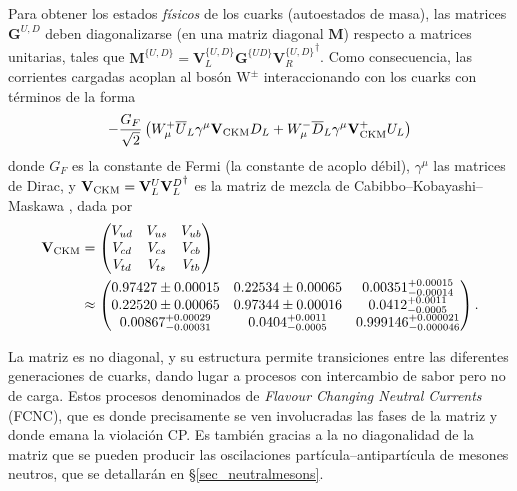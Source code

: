 Para obtener los estados \emph{físicos} de los cuarks (autoestados de masa), las matrices $\mathbf{G}^{U,D}$ deben diagonalizarse (en una matriz diagonal $\mathbf{M}$) respecto a matrices unitarias, tales que $\mathbf{M}^{\{U,D\}}=\mathbf{V}_L^{\{U,D\}} \mathbf{G}^{\{UD\}} {\mathbf{V}_R^{\{U,D\}}}^{\dagger}$.
%
Como consecuencia, las corrientes cargadas acoplan al bosón $\mathrm{W^{\pm}}$ interaccionando con los cuarks con términos de la forma
\begin{equation}
	-\frac{G_F}{\sqrt{2}} \left( W_{\mu}^+ \overline{U}_L \gamma^{\mu}  \mathbf{V}_{\text{CKM}} D_L + W_{\mu}^- \overline{D}_L \gamma^{\mu}  \mathbf{V}_{\text{CKM}}^+ U_L \right)
\end{equation}
donde $G_F$ es la constante de Fermi (la constante de acoplo débil), $\gamma^{\mu}$ las matrices de Dirac, y $\mathbf{V}_{\text{CKM}}= \mathbf{V}_L^U {\mathbf{V}_L^D}^{\dagger}$ es la matriz de mezcla de Cabibbo--Kobayashi--Maskawa \cite{pdg2018}, dada por \color{new}
\begin{align}
  \mathbf{V}_{\text{CKM}}  &= \begin{pmatrix}
	V_{ud} & V_{us} & V_{ub} \\
	V_{cd} & V_{cs} & V_{cb} \\
	V_{td} & V_{ts} & V_{tb} \\
\end{pmatrix} \\ & \approx \begin{pmatrix}
0.97427 \pm 0.00015 & 0.22534 \pm 0.00065 & 0.00351^{+0.00015}_{-0.00014} \\
0.22520 \pm 0.00065 & 0.97344 \pm 0.00016 & 0.0412^{+0.0011}_{-0.0005} \\
0.00867^{+0.00029}_{-0.00031} & 0.0404^{+0.0011}_{-0.0005} & 0.999146^{+0.000021}_{-0.000046}
\end{pmatrix}. \nonumber
\end{align}

La matriz es no diagonal, y su estructura permite transiciones entre las diferentes generaciones de cuarks, dando lugar a procesos con intercambio de sabor pero no de carga. Estos procesos denominados de \textit{Flavour Changing Neutral Currents} (FCNC), que es donde precisamente se ven involucradas las fases de la matriz y donde emana la violación CP. Es también gracias a la no diagonalidad de la matriz que se pueden producir las oscilaciones partícula--antipartícula de mesones neutros, que se detallarán en \S \ref{sec_neutralmesons}.



